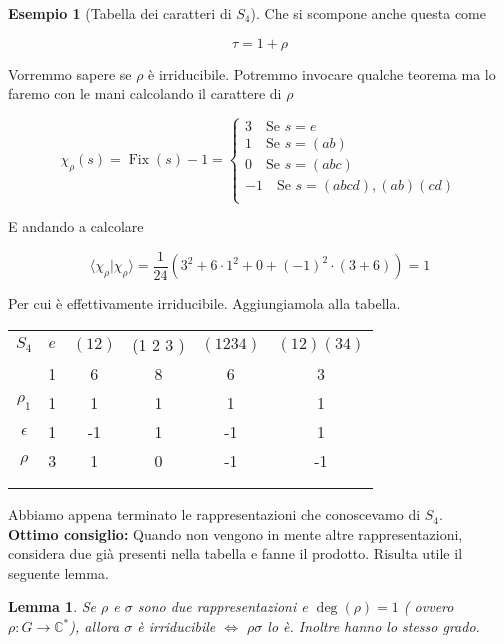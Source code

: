 \documentclass[11pt]{article}
\theoremstyle{plain}
\newtheorem{lemma}[thm]{Lemma}
\theoremstyle{definition}
\newtheorem{exmp}{Esempio}[section]
\theoremstyle{remark}
\DeclareMathOperator{\Fix}{Fix}
\begin{document}
\begin{exmp}[Tabella dei caratteri di $S_4$]
Che si scompone anche questa come

\[ \tau = 1 + \rho\]

Vorremmo sapere se $\rho$ è irriducibile. Potremmo invocare qualche teorema ma lo faremo con le mani calcolando il carattere di $\rho$


\[ \chi_\rho(s) = \Fix(s) - 1 = 
\begin{cases}
3 \quad \text{Se } s = e \\
1 \quad \text{Se } s = (a b) \\
0 \quad \text{Se } s = (a b c) \\
-1 \quad \text{Se } s = (a b c d ), (a b) (c d)\\
\end{cases}
\]

E andando a calcolare

\[\langle\chi_\rho |\chi_\rho\rangle = \dfrac{1}{24}\left(3^2  + 6 \cdot 1^2  + 0 + (-1)^2 \cdot (3 +6 )\right) = 1\]
 

Per cui è effettivamente irriducibile.  Aggiungiamola alla tabella.


\begin{table}[!ht]
\centering
\begin{tabular}{|c|c|c|c|c|c|}
\hline
$S_4$  & $e$ & $(1 2)$ & (1 2 3 ) & $(1 2 3 4)$ & $(1 2)(3 4)$ \\
 & 1 & 6 & 8 & 6 & 3 \\
\hline
 $\rho_1$ & 1 & 1  & 1 & 1 & 1\\
\hline
$\epsilon$ & 1  & -1 & 1 & -1 & 1 \\
\hline
$\rho$& 3 & 1 & 0 & -1 & -1\\
\hline
& &  & & & \\
\hline
& &  & & & \\
\hline
\end{tabular}
\end{table}

Abbiamo appena terminato le rappresentazioni che conoscevamo di $S_4$.\\
\textbf{Ottimo consiglio:} Quando non vengono in mente altre rappresentazioni, considera due già presenti nella tabella e fanne il prodotto. Risulta utile il seguente lemma.

\begin{lemma}
Se $\rho$ e $\sigma$ sono due rappresentazioni e $\deg(\rho)=1$ ( ovvero $\rho:G\rightarrow \mathbb{C}^*$), allora $\sigma$ è irriducibile $\Leftrightarrow$ $\rho\sigma$ lo è. Inoltre hanno lo stesso grado.
\end{lemma}


\end{exmp}
\end{document}
